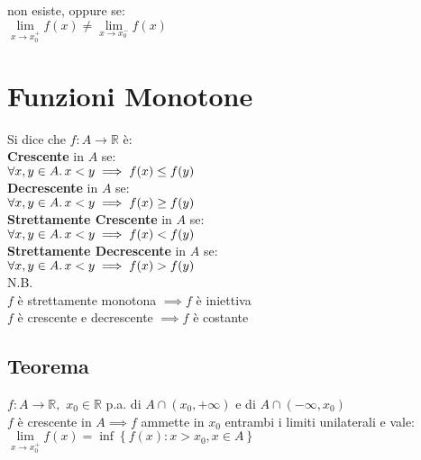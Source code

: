 \documentclass[a4paper, twoside, italian, 11pt]{book}
\newcommand{\braces}[1] {\left \{ #1 \right \}}
\newcommand{\R}{\mathbb{R}}
\begin{document}
\noindent
non esiste, oppure se: \\

$\lim\limits_{x \to x_0^+} f(x) \neq \lim\limits_{x \to x_0^-} f(x)$



\section{Funzioni Monotone}

\noindent
Si dice che $f : A \rightarrow \R$ è: \\

\noindent
\textbf{Crescente} in $A$ se: \\

$\forall x, y \in A \ldotp x < y \implies f(x) \leq f(y)$ \\

\noindent
\textbf{Decrescente} in $A$ se: \\

$\forall x, y \in A \ldotp x < y \implies f(x) \geq f(y)$ \\

\noindent
\textbf{Strettamente Crescente} in $A$ se: \\

$\forall x, y \in A \ldotp x < y \implies f(x) < f(y)$ \\

\noindent
\textbf{Strettamente Decrescente} in $A$ se: \\

$\forall x, y \in A \ldotp x < y \implies f(x) > f(y)$ \\

\noindent
N.B. \\
$f$ è strettamente monotona $\implies f$ è iniettiva \\
$f$ è crescente e decrescente $\implies f$ è costante


\subsection{Teorema}

\noindent
$f : A \rightarrow \R,$ $x_0 \in \R$ p.a. di $A \cap (x_0, +\infty)$ e di $A \cap (-\infty, x_0)$ \\

\noindent
$f$ è crescente in $A \implies f$ ammette in $x_0$ entrambi i limiti unilaterali e vale: \\

$\lim\limits_{x \to x_0^+} f(x) = \inf \braces{f(x) : x > x_0, x \in A}$ \\
\end{document}
